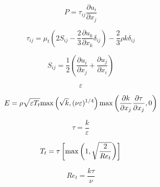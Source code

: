 {\newpage\clearpage
{}%
\begin{displaymath}
P = \tau_{ij} \frac{\partial u_i}{\partial x_j}
\end{displaymath}%
\lthtmldisplayZ
\lthtmlcheckvsize\clearpage}

{\newpage\clearpage
{}%
\begin{displaymath}
\tau_{ij} = \mu_t \left(2S_{ij} - \frac{2}{3} \frac{\partial u_k}{\partial x_k} \delta_{ij} \right)
   - \frac{2}{3} \rho k \delta_{ij}
\end{displaymath}%
\lthtmldisplayZ
\lthtmlcheckvsize\clearpage}

{\newpage\clearpage
{}%
\begin{displaymath}
S_{ij} = \frac{1}{2} \left( \frac{\partial u_i}{\partial x_j} + \frac{\partial u_j}{\partial x_i} \right)
\end{displaymath}%
\lthtmldisplayZ
\lthtmlcheckvsize\clearpage}

{\newpage\clearpage
{}%
\begin{displaymath}
\varepsilon
\end{displaymath}%
\lthtmldisplayZ
\lthtmlcheckvsize\clearpage}

{\newpage\clearpage
{}%
\begin{displaymath}
E = \rho \sqrt{\varepsilon T_t} {\rm max}\left( \sqrt{k}, (\nu \varepsilon)^{1/4} \right)
   {\rm max} \left( \frac{\partial k}{\partial x_j} 
   \frac{\partial \tau}{\partial x_j},0 \right)
\end{displaymath}%
\lthtmldisplayZ
\lthtmlcheckvsize\clearpage}

{\newpage\clearpage
{}%
\begin{displaymath}
\tau = \frac{k}{\varepsilon}
\end{displaymath}%
\lthtmldisplayZ
\lthtmlcheckvsize\clearpage}

{\newpage\clearpage
{}%
\begin{displaymath}
T_t = \tau \left[ {\rm max} \left( 1, \sqrt{\frac{2}{Re_t}} \right) \right]
\end{displaymath}%
\lthtmldisplayZ
\lthtmlcheckvsize\clearpage}

{\newpage\clearpage
{}%
\begin{displaymath}
Re_t = \frac{k \tau}{\nu}
\end{displaymath}%
\lthtmldisplayZ
\lthtmlcheckvsize\clearpage}

